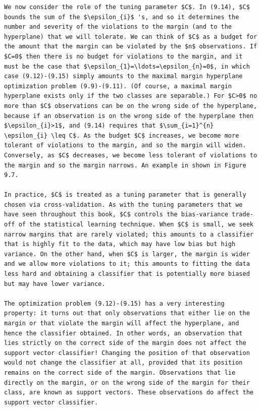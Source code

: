 \documentclass[10pt]{article}
\begin{document}
\begin{verbatim}
We now consider the role of the tuning parameter $C$. In (9.14), $C$ bounds the sum of the $\epsilon_{i}$ 's, and so it determines the number and severity of the violations to the margin (and to the hyperplane) that we will tolerate. We can think of $C$ as a budget for the amount that the margin can be violated by the $n$ observations. If $C=0$ then there is no budget for violations to the margin, and it must be the case that $\epsilon_{1}=\ldots=\epsilon_{n}=0$, in which case (9.12)-(9.15) simply amounts to the maximal margin hyperplane optimization problem (9.9)-(9.11). (Of course, a maximal margin hyperplane exists only if the two classes are separable.) For $C>0$ no more than $C$ observations can be on the wrong side of the hyperplane, because if an observation is on the wrong side of the hyperplane then $\epsilon_{i}>1$, and (9.14) requires that $\sum_{i=1}^{n} \epsilon_{i} \leq C$. As the budget $C$ increases, we become more tolerant of violations to the margin, and so the margin will widen. Conversely, as $C$ decreases, we become less tolerant of violations to the margin and so the margin narrows. An example in shown in Figure 9.7.

In practice, $C$ is treated as a tuning parameter that is generally chosen via cross-validation. As with the tuning parameters that we have seen throughout this book, $C$ controls the bias-variance trade-off of the statistical learning technique. When $C$ is small, we seek narrow margins that are rarely violated; this amounts to a classifier that is highly fit to the data, which may have low bias but high variance. On the other hand, when $C$ is larger, the margin is wider and we allow more violations to it; this amounts to fitting the data less hard and obtaining a classifier that is potentially more biased but may have lower variance.

The optimization problem (9.12)-(9.15) has a very interesting property: it turns out that only observations that either lie on the margin or that violate the margin will affect the hyperplane, and hence the classifier obtained. In other words, an observation that lies strictly on the correct side of the margin does not affect the support vector classifier! Changing the position of that observation would not change the classifier at all, provided that its position remains on the correct side of the margin. Observations that lie directly on the margin, or on the wrong side of the margin for their class, are known as support vectors. These observations do affect the support vector classifier.


\end{verbatim}
\end{document}
